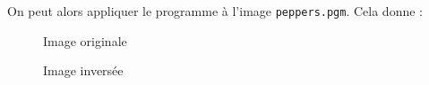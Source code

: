 \documentclass[french,a4paper,10pt]{article}
\begin{document}
    On peut alors appliquer le programme à l'image \texttt{peppers.pgm}.
    Cela donne :
    \begin{figure}[!htb]
            \begin{minipage}{0.48\textwidth}
                \centering
                \caption{Image originale}\label{Fig:peppers-grey}
            \end{minipage}\hfill
            \begin{minipage}{0.48\textwidth}
                \centering
                \caption{Image inversée}\label{Fig:peppers-grey-inverse}
            \end{minipage}
        \end{figure}
\end{document}
